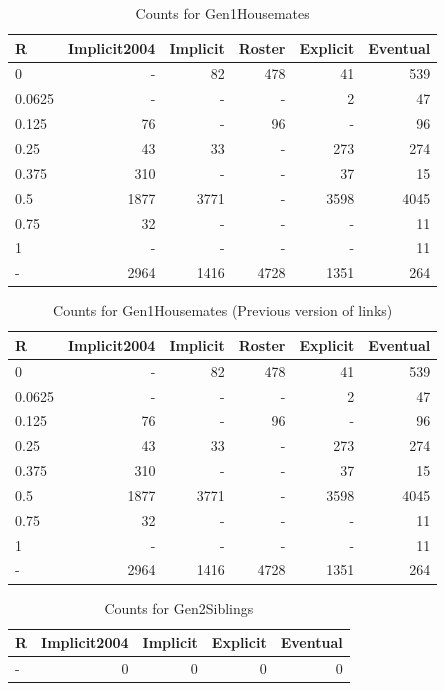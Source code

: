 \documentclass[a4paper]{article}\usepackage[]{graphicx}\usepackage[]{color}
\begin{document}
\begin{table}[ht]
\centering
{\large
\begin{tabular}{lrrrrr}
  \hline
R & Implicit2004 & Implicit & Roster & Explicit & Eventual \\ 
  \hline
0 & - &  82 & 478 &  41 & 539 \\ 
  0.0625 & - & - & - &   2 &  47 \\ 
  0.125 &  76 & - &  96 & - &  96 \\ 
  0.25 &  43 &  33 & - & 273 & 274 \\ 
  0.375 & 310 & - & - &  37 &  15 \\ 
  0.5 & 1877 & 3771 & - & 3598 & 4045 \\ 
  0.75 &  32 & - & - & - &  11 \\ 
  1 & - & - & - & - &  11 \\ 
  - & 2964 & 1416 & 4728 & 1351 & 264 \\ 
   \hline
\end{tabular}
}
\caption{Counts for Gen1Housemates} 
\end{table}
\begin{table}[ht]
\centering
{\large
\begin{tabular}{lrrrrr}
  \hline
R & Implicit2004 & Implicit & Roster & Explicit & Eventual \\ 
  \hline
0 & - &  82 & 478 &  41 & 539 \\ 
  0.0625 & - & - & - &   2 &  47 \\ 
  0.125 &  76 & - &  96 & - &  96 \\ 
  0.25 &  43 &  33 & - & 273 & 274 \\ 
  0.375 & 310 & - & - &  37 &  15 \\ 
  0.5 & 1877 & 3771 & - & 3598 & 4045 \\ 
  0.75 &  32 & - & - & - &  11 \\ 
  1 & - & - & - & - &  11 \\ 
  - & 2964 & 1416 & 4728 & 1351 & 264 \\ 
   \hline
\end{tabular}
}
\caption{Counts for Gen1Housemates (Previous version of links)} 
\end{table}
\begin{table}[ht]
\centering
{\large
\begin{tabular}{lrrrr}
  \hline
R & Implicit2004 & Implicit & Explicit & Eventual \\ 
  \hline
- &   0 &   0 &   0 &   0 \\ 
   \hline
\end{tabular}
}
\caption{Counts for Gen2Siblings} 
\end{table}
\end{document}
